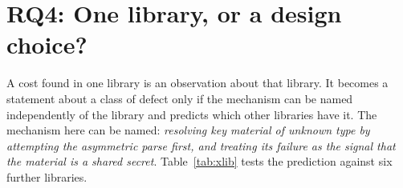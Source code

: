 \documentclass[pdflatex,sn-basic,twocolumn]{sn-jnl}%
\begin{document}
\section{RQ4: One library, or a design choice?}\label{sec:rq4}

A cost found in one library is an observation about that library. It becomes a
statement about a class of defect only if the mechanism can be named
independently of the library and predicts which other libraries have it. The
mechanism here can be named: \emph{resolving key material of unknown type by
attempting the asymmetric parse first, and treating its failure as the signal
that the material is a shared secret}. Table~\ref{tab:xlib} tests the
prediction against six further libraries.
\end{document}
